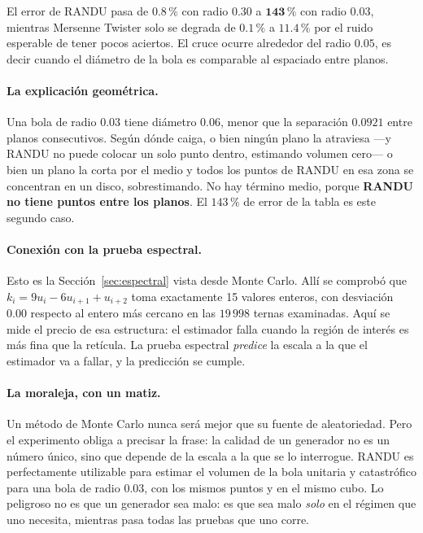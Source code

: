 El error de RANDU pasa de $0.8\,\%$ con radio $0.30$ a $\mathbf{143\,\%}$ con
radio $0.03$, mientras Mersenne Twister solo se degrada de $0.1\,\%$ a
$11.4\,\%$ por el ruido esperable de tener pocos aciertos. El cruce ocurre
alrededor del radio $0.05$, es decir cuando el diámetro de la bola es
comparable al espaciado entre planos.

\paragraph{La explicación geométrica.} Una bola de radio $0.03$ tiene diámetro
$0.06$, menor que la separación $0.0921$ entre planos consecutivos. Según dónde
caiga, o bien ningún plano la atraviesa —y RANDU no puede colocar un solo punto
dentro, estimando volumen cero— o bien un plano la corta por el medio y todos
los puntos de RANDU en esa zona se concentran en un disco, sobrestimando. No
hay término medio, porque \textbf{RANDU no tiene puntos entre los planos}. El
$143\,\%$ de error de la tabla es este segundo caso.

\paragraph{Conexión con la prueba espectral.} Esto es la
Sección~\ref{sec:espectral} vista desde Monte Carlo. Allí se comprobó que
$k_i = 9u_i - 6u_{i+1} + u_{i+2}$ toma exactamente 15 valores enteros, con
desviación $0.00$ respecto al entero más cercano en las $19\,998$ ternas
examinadas. Aquí se mide el precio de esa estructura: el estimador falla cuando
la región de interés es más fina que la retícula. La prueba espectral
\emph{predice} la escala a la que el estimador va a fallar, y la predicción se
cumple.

\paragraph{La moraleja, con un matiz.} Un método de Monte Carlo nunca será
mejor que su fuente de aleatoriedad. Pero el experimento obliga a precisar la
frase: la calidad de un generador no es un número único, sino que depende de la
escala a la que se lo interrogue. RANDU es perfectamente utilizable para
estimar el volumen de la bola unitaria y catastrófico para una bola de radio
$0.03$, con los mismos puntos y en el mismo cubo. Lo peligroso no es que un
generador sea malo: es que sea malo \emph{solo} en el régimen que uno necesita,
mientras pasa todas las pruebas que uno corre.
